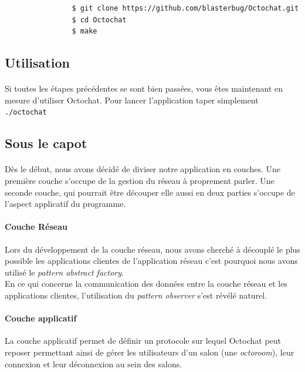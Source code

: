 \documentclass[a4paper]{article}
\begin{document}
			\begin{verbatim}
				$ git clone https://github.com/blasterbug/Octochat.git
				$ cd Octochat
				$ make
			\end{verbatim}

		\subsection{Utilisation}
			\paragraph{}{
			Si toutes les étapes précédentes se sont bien passées, vous êtes maintenant en mesure d'utiliser Octochat.
			Pour lancer l'application taper simplement \verb|./octochat|
			}

		\subsection{Sous le capot}
			\paragraph{}{
			Dès le début, nous avons décidé de diviser notre application en couches.
			Une première couche s'occupe de la gestion du réseau à proprement parler. Une seconde couche,
			qui pourrait être découper elle aussi en deux parties s'occupe de l'aspect applicatif du programme.
			}

			\paragraph{Couche Réseau}{
			Lors du développement de la couche réseau, nous avons cherché à découplé le plus possible les
			applications clientes de l’application réseau c’est pourquoi nous avons utilisé le \textit{pattern
			abstract factory}. \\
			En ce qui concerne la communication des données entre la couche réseau et les applications clientes,
			l’utilisation du \textit{pattern observer} s’est révélé naturel.
			}

			\paragraph{Couche applicatif}{
			La couche applicatif permet de définir un protocole sur lequel Octochat peut reposer permettant ainsi
			de gérer les utilisateurs d'un salon (une \textit{octoroom}), leur connexion et leur déconnexion au sein
			des salons.
			}
			
\end{document}
